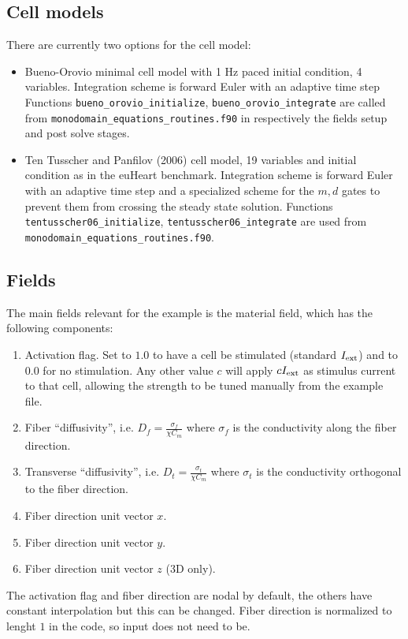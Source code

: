 \subsection{Cell models}
There are currently two options for the cell model:
\begin{itemize}
 \item   Bueno-Orovio minimal cell model  with 1 Hz paced initial condition, 4 variables. 
 Integration scheme is forward Euler with an adaptive time step 
Functions \verb!bueno_orovio_initialize!, \verb!bueno_orovio_integrate! are called from \verb!monodomain_equations_routines.f90! in respectively the fields setup and post solve stages. 
 \item   Ten Tusscher and Panfilov (2006) cell model, 19 variables and initial condition as in the euHeart benchmark. Integration scheme is forward Euler with an adaptive time step and a specialized scheme for the $m,d$ gates to prevent them from crossing the steady state solution.
Functions \verb!tentusscher06_initialize!, \verb!tentusscher06_integrate! are used from \verb!monodomain_equations_routines.f90!.
\end{itemize}



\subsection{Fields}
The main fields relevant for the example is the material field, which has the following components:
\begin{enumerate}
 \item Activation flag. Set to $1.0$ to have a cell be stimulated (standard $I_{\text{ext}}$) and to $0.0$ for no stimulation. Any other value $c$ will apply $c I_{\text{ext}}$ as stimulus current to that cell, allowing the strength to be tuned manually from the example file.
 \item Fiber ``diffusivity'', i.e. $D_f=\frac{\sigma_f}{\chi C_m}$ where $\sigma_f$ is the conductivity along the fiber direction.
 \item Transverse ``diffusivity'', i.e. $D_t=\frac{\sigma_t}{\chi C_m}$ where $\sigma_t$ is the conductivity orthogonal to the fiber direction.
 \item Fiber direction unit vector $x$.
 \item Fiber direction unit vector $y$.
 \item Fiber direction unit vector $z$ (3D only).
\end{enumerate}
The activation flag and fiber direction are nodal by default, the others have constant interpolation but this can be changed.
Fiber direction is normalized to lenght $1$ in the code, so input does not need to be.

